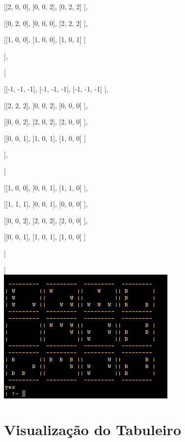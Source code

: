 \documentclass[a4paper]{article}
\begin{document}
		 [[2, 0, 0],
		  [0, 0, 2],
		  [0, 2, 2]
		 ],

		 [[0, 2, 0],
		  [0, 0, 0],
		  [2, 2, 2]
		 ],

		 [[1, 0, 0],
		  [1, 0, 0],
		  [1, 0, 1]
		 ]

		],



		[

		 [[-1, -1, -1],
		  [-1, -1, -1],
		  [-1, -1, -1]
		 ],

		 [[2, 2, 2],
		  [0, 0, 2],
		  [0, 0, 0]
		 ],

		 [[0, 0, 2],
		  [2, 0, 2],
		  [2, 0, 0]
		 ],

		 [[0, 0, 1],
		  [1, 0, 1],
		  [1, 0, 0]
		 ]

		],


		[

		 [[1, 0, 0],
		  [0, 0, 1],
		  [1, 1, 0]
		 ],

		 [[1, 1, 1],
		  [0, 0, 1],
		  [0, 0, 0]
		 ],

		 [[0, 0, 2],
		  [2, 0, 2],
		  [2, 0, 0]
		 ],

		 [[0, 0, 1],
		  [1, 0, 1],
		  [1, 0, 0]
		 ]

		]
		
	]\linebreak\linebreak\\

\includegraphics[scale=0.6]{../printscreens/winning_board.png} \linebreak




\section{Visualização do Tabuleiro}
\end{document}
